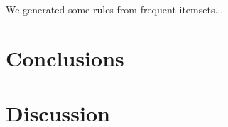 \documentclass[english]{tktltiki2}
\begin{document}
We generated some rules from frequent itemsets... %

\section{Conclusions}



\section{Discussion}



\pagebreak

%
%
% 
%




\lastpage
\end{document}
